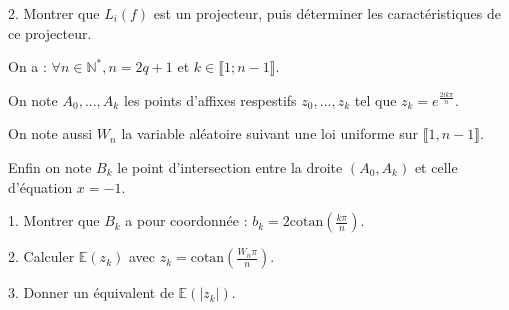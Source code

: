 \vspace{5pt}
2. Montrer que $L_i(f)$ est un projecteur, puis déterminer les caractéristiques de ce projecteur.



\subetoiles



\noindent On a : $\forall n \in \mathbb{N}^*, n = 2q + 1$ et $k \in \llbracket 1; n-1 \rrbracket$.

\noindent On note $A_0, ..., A_k$ les points d'affixes respestifs $z_0, ..., z_k$ tel que $z_k = e^{\frac {2ik\pi} {n}}$.

\noindent On note aussi $W_n$ la variable aléatoire suivant une loi uniforme sur $\llbracket 1, n-1 \rrbracket$.

\noindent Enfin on note $B_k$ le point d'intersection entre la droite $(A_0, A_k)$ et celle d'équation $x=-1$.

\vspace{5pt}
1. Montrer que $B_k$ a pour coordonnée : $\displaystyle b_k = 2\mathrm{cotan}\left(\frac {k\pi} {n}\right)$.

\vspace{5pt}
2. Calculer $\displaystyle \mathbb{E}(z_k)$ avec $\displaystyle z_k = \mathrm{cotan}\left(\frac {W_n\pi} {n}\right)$.

\vspace{5pt}
3. Donner un équivalent de $\mathbb{E}(|z_k|)$.

